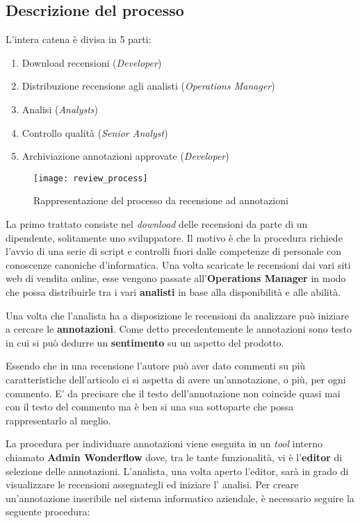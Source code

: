 \subsection{Descrizione del processo}
\label{subsec:processo_recensioni_annotazioni}
L'intera catena è divisa in 5 parti:
\begin{enumerate}
  \item Download recensioni (\textit{Developer})
  \item Distribuzione recensione agli analisti (\textit{Operations Manager})
  \item Analisi (\textit{Analysts})
  \item Controllo qualità (\textit{Senior Analyst})
  \item Archiviazione annotazioni approvate (\textit{Developer})
\end{enumerate}

\begin{figure}[ht]
\begin{center}
\texttt{[image: review\_process]}
\caption{Rappresentazione del processo da recensione ad annotazioni}
\label{fig:review_process}
\end{center}
\end{figure}

La primo trattato consiste nel \textit{download} delle recensioni da parte di
un dipendente, solitamente uno sviluppatore. Il motivo è che la procedura
richiede l'avvio di una serie di \gls{script} e controlli fuori dalle
competenze di personale con conoscenze canoniche d'informatica.
Una volta scaricate le recensioni dai vari siti web di vendita online, esse
vengono passate all'\textbf{Operations Manager} in modo che possa distribuirle
tra i vari \textbf{analisti} in base alla disponibilità e alle abilità.

Una volta che l'analista ha a disposizione le recensioni da analizzare può
iniziare a cercare le \textbf{annotazioni}. Come detto precedentemente le
annotazioni sono testo in cui si può dedurre un \textbf{sentimento} su un
aspetto del prodotto.

Essendo che in una recensione l'autore può aver dato commenti su più 
caratteristiche dell'articolo ci si aspetta di avere un'annotazione, o più, per
ogni commento. E' da precisare che il testo dell'annotazione non coincide quasi
mai con il testo del commento ma è ben si una sua sottoparte che possa
rappresentarlo al meglio.

La procedura per individuare annotazioni viene eseguita in un \textit{tool}
interno chiamato \textbf{Admin Wonderflow} dove, tra le tante funzionalità, vi è
l'\textbf{editor} di selezione delle annotazioni. L'analista, una volta aperto
l'editor, sarà in grado di visualizzare le recensioni assegnategli ed iniziare l'
analisi. Per creare un'annotazione inseribile nel sistema informatico aziendale,
è necessario seguire la seguente procedura:


